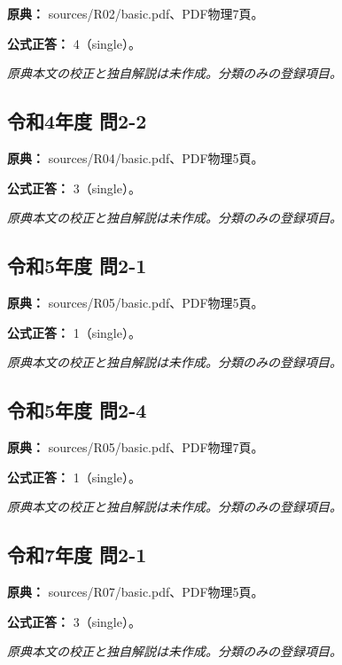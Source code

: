 \noindent\textbf{原典：} sources/R02/basic.pdf、PDF物理7頁。

\textbf{公式正答：} 4（single）。

\par\textit{原典本文の校正と独自解説は未作成。分類のみの登録項目。}

\subsection{令和4年度 問2-2}
\label{q:r04-reg-basic-2-2}

\noindent\textbf{原典：} sources/R04/basic.pdf、PDF物理5頁。

\textbf{公式正答：} 3（single）。

\par\textit{原典本文の校正と独自解説は未作成。分類のみの登録項目。}

\subsection{令和5年度 問2-1}
\label{q:r05-reg-basic-2-1}

\noindent\textbf{原典：} sources/R05/basic.pdf、PDF物理5頁。

\textbf{公式正答：} 1（single）。

\par\textit{原典本文の校正と独自解説は未作成。分類のみの登録項目。}

\subsection{令和5年度 問2-4}
\label{q:r05-reg-basic-2-4}

\noindent\textbf{原典：} sources/R05/basic.pdf、PDF物理7頁。

\textbf{公式正答：} 1（single）。

\par\textit{原典本文の校正と独自解説は未作成。分類のみの登録項目。}

\subsection{令和7年度 問2-1}
\label{q:r07-reg-basic-2-1}

\noindent\textbf{原典：} sources/R07/basic.pdf、PDF物理5頁。

\textbf{公式正答：} 3（single）。

\par\textit{原典本文の校正と独自解説は未作成。分類のみの登録項目。}
